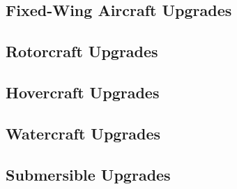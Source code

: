 \begin{multicols*}{2}
	\subsection{Fixed-Wing Aircraft Upgrades}
	
	\subsection{Rotorcraft Upgrades}
	
	\subsection{Hovercraft Upgrades}
	
	\subsection{Watercraft Upgrades}
	
	\subsection{Submersible Upgrades}


\end{multicols*}
